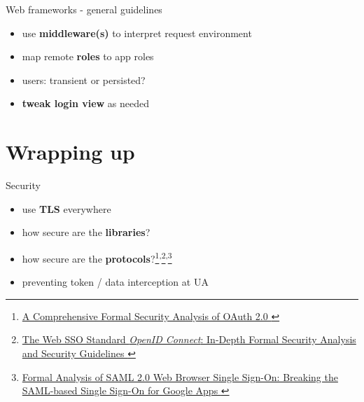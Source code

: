 \documentclass[ignorenonframetext,aspectratio=169]{beamer}
\providecommand{\tightlist}{%
  \setlength{\itemsep}{0pt}\setlength{\parskip}{0pt}}
\begin{document}
\begin{frame}{Web frameworks - general guidelines}
\begin{itemize}
\tightlist
\item use {\bf middleware(s)} to interpret request environment
\item map remote {\bf roles} to app roles
\item users: transient or persisted?
\item {\bf tweak login view} as needed
\end{itemize}
\end{frame}

\section{Wrapping up}

\begin{frame}{Security}
\begin{itemize}
\tightlist
\item use {\bf TLS} everywhere
\item how secure are the {\bf libraries}?
\item how secure are the {\bf
    protocols}?\footnote{
        \href{https://arxiv.org/pdf/1601.01229v2.pdf}{
            A Comprehensive Formal Security Analysis of OAuth 2.0
        }
    }\textsuperscript{,}\footnote{
        \href{https://arxiv.org/pdf/1704.08539.pdf}{
            The Web SSO Standard {\em OpenID Connect}:
            In-Depth Formal Security Analysis and Security Guidelines
        }
    }\textsuperscript{,}\footnote{
        \href{https://ai-lab.it/armando/pub/fmse9-armando.pdf}{
            Formal Analysis of SAML 2.0 Web Browser Single Sign-On:
            Breaking the SAML-based Single Sign-On for Google Apps
        }
    }
\item preventing token / data interception at UA
\end{itemize}
\end{frame}
\end{document}
